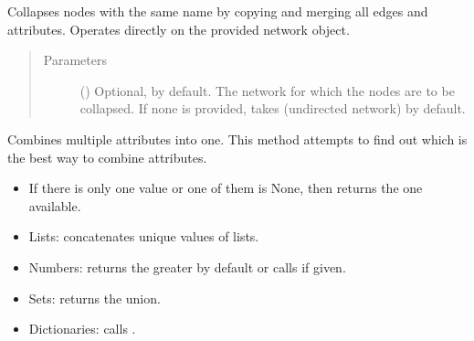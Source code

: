 \documentclass[letterpaper,10pt,english]{sphinxmanual}
\begin{document}
\begin{fulllineitems}

\begin{fulllineitems}
\label{\detokenize{main:pypath.main.PyPath.collapse_by_name}}
Collapses nodes with the same name by copying and merging
all edges and attributes. Operates directly on the provided
network object.
\begin{quote}\begin{description}
\item[{Parameters}] \leavevmode
{} () \textendash{} Optional,  by default. The network for which the
nodes are to be collapsed. If none is provided, takes
 (undirected network) by
default.

\end{description}\end{quote}

\end{fulllineitems}


\begin{fulllineitems}
\label{\detokenize{main:pypath.main.PyPath.combine_attr}}
Combines multiple attributes into one. This method attempts
to find out which is the best way to combine attributes.
\begin{itemize}
\item {} 
If there is only one value or one of them is None, then
returns the one available.

\item {} 
Lists: concatenates unique values of lists.

\item {} 
Numbers: returns the greater by default or calls
 if given.

\item {} 
Sets: returns the union.

\item {} 
Dictionaries: calls .


\end{itemize}
\end{fulllineitems}
\end{fulllineitems}
\end{document}
